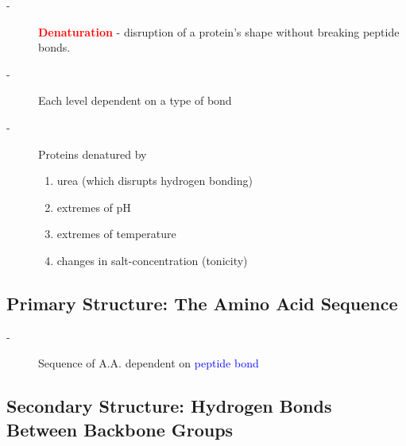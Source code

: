 \documentclass[10pt,a4paper]{report}
\begin{document}
	\begin{description}
		\item[-] \textcolor{red}{\textbf{Denaturation}} - disruption of a protein's shape without breaking peptide bonds.
		\item[-] Each level dependent on a type of bond
		\item[-] Proteins denatured by
		\begin{enumerate}
			\item urea (which disrupts hydrogen bonding)
			\item extremes of pH
			\item extremes of temperature
			\item changes in salt-concentration (tonicity) 
		\end{enumerate}
	\end{description}
	
	\subsection{Primary Structure: The Amino Acid Sequence}
	
	\begin{description}
		\item[-] Sequence of A.A. dependent on \textcolor{blue}{peptide bond}
	\end{description}
	
	\subsection{Secondary Structure: Hydrogen Bonds Between Backbone Groups}
	
\end{document}

